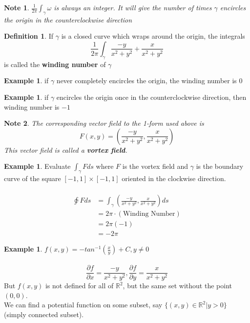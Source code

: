\documentclass[12pt]{article}
\theoremstyle{plain}
\newtheorem*{note}{Note}
\theoremstyle{definition}
\newtheorem{definition}[theorem]{Definition}
\newtheorem{example}[theorem]{Example}
\begin{document}
	\begin{note}
		$\frac{1}{2\pi} \int_{\gamma} \omega$ is always an integer. It will give the number of times $\gamma$ encircles the origin in the counterclockwise direction
	\end{note}

	\begin{definition}
		If $\gamma$ is a closed curve which wraps around the origin, the integrals
		$$\frac{1}{2\pi} \int_{\gamma} \frac{-y}{x^2+y^2} + \frac{x}{x^2+y^2}$$
		is called the \textbf{winding number} of $\gamma$
	\end{definition}

	\begin{example}
		if $\gamma$ never completely encircles the origin, the winding number is 0
	\end{example}

	\begin{example}
		if $\gamma$ encircles the origin once in the counterclockwise direction, then winding number is $-1$
	\end{example}

	\begin{note}
		The corresponding vector field to the 1-form used above is
		$$F(x,y) = (\frac{-y}{x^2+y^2}, \frac{x}{x^2+y^2})$$
		This vector field is called a \textbf{vortex field}.
	\end{note}

	\begin{example}
		Evaluate $\int_\gamma F ds$ where $F$ is the vortex field and $\gamma$ is the boundary curve of the square $[-1,1] \times [-1,1]$ oriented in the clockwise direction.\\
		\\
		\begin{align*}
			\varointclockwise F ds &= \int_\gamma (\frac{-y}{x^2+y^2}, \frac{x}{x^2+y^2}) ds\\
			&= 2\pi \cdot (\text{Winding Number})\\
			&= 2\pi (-1)\\
			&= -2\pi
		\end{align*}
	\end{example}

	\begin{example}
		$f(x,y) = -tan^{-1} (\frac{x}{y}) + C, y\neq 0$\\
		\\
		$$\frac{\partial f}{\partial x} = \frac{-y}{x^2+y^2}, \frac{\partial f}{\partial y} = \frac{x}{x^2+y^2}$$
		But $f(x,y)$ is not defined for all of $\mathbb{R}^2$, but the same set without the point $(0,0)$.\\
		We can find a potential function on some subset, say $\{ (x,y)\in\mathbb{R}^2 | y>0 \}$ (simply connected subset).
	\end{example}
\end{document}
